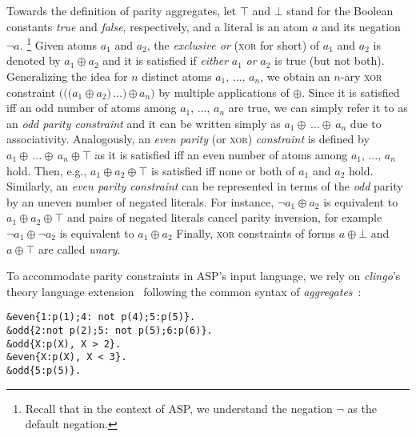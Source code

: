 \documentclass{article}
\newcommand{\XOR}{\textsc{xor}} %
\newcommand{\sysfont}{\textit}
\newcommand{\clingo}{\sysfont{clingo}}
\newcommand{\rg}[3]{{#1}{#2}\,\ldots{#2}\,{#3}}
\newcommand{\xor}{\oplus}
\newcommand{\true}{\top}
\newcommand{\false}{\bot}
\begin{document}
Towards the definition of parity aggregates, let $\true$ and $\false$
stand for the Boolean constants \emph{true} and \emph{false},
respectively, and a literal is an atom $a$ and its negation $\neg a$.
\footnote{Recall that in the context of ASP, we understand the negation $\neg$ as the default negation.}
%
Given atoms $a_1$ and $a_2$, the \emph{exclusive or}
(\XOR{} for short) of $a_1$ and $a_2$ is denoted by $a_1\xor a_2$ and
it is satisfied if \emph{either} $a_1$ \emph{or} $a_2$ is true (but
not both).
Generalizing the idea for $n$ distinct atoms
$\rg{a_1}{,}{a_n}$, we obtain an $n$-ary \XOR{} constraint
$\rg{(((a_1\xor a_2}{)}{\xor\,a_n)}$ by multiple applications of
$\xor$. Since it is satisfied iff an odd number of atoms among
$\rg{a_1}{,}{a_n}$ are true,
we can simply refer it to as an \emph{odd parity constraint}
and it can be written simply as
$\rg{a_1}{\xor}{a_n}$ due to associativity.
%
Analogously, an \emph{even parity} (or \XOR{}) \emph{constraint} is defined by
$\rg{a_1}{\xor}{a_n}\xor\true$ as it is satisfied iff an even number
of atoms among $\rg{a_1}{,}{a_n}$ hold. Then, e.g.,
%
$a_1\xor a_2\xor\true$
%
is satisfied iff none or both of $a_1$ and $a_2$ hold.
%
Similarly, an \emph{even parity constraint} can be represented in terms of the \emph{odd} parity by an uneven
number of negated literals.
For instance, $\neg a_1\xor a_2$ is equivalent to $a_1\xor a_2\xor\true$ and pairs of negated literals cancel parity inversion, for example $\neg a_1\xor \neg a_2$ is equivalent to $a_1\xor a_2$
Finally, \XOR{} constraints of forms $a\xor\false$ and $a\xor\true$
are called \emph{unary}.

To accommodate parity constraints in ASP's input language,
we rely on \clingo’s theory language extension~\cite{DBLP:conf/iclp/GebserKKOSW16}
following the common syntax of \emph{aggregates}~\cite{DBLP:journals/tplp/GebserHKLS15}:

\begin{verbatim}
&even{1:p(1);4: not p(4);5:p(5)}.
&odd{2:not p(2);5: not p(5);6:p(6)}.
&odd{X:p(X), X > 2}.
&even{X:p(X), X < 3}.
&odd{5:p(5)}.
\end{verbatim}
\end{document}
